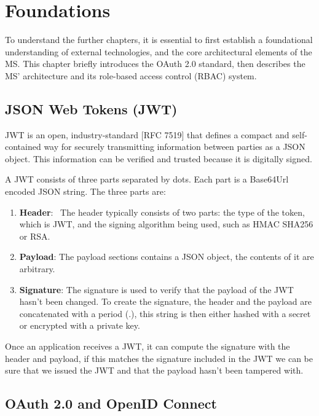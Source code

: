 \chapter{Foundations}
\label{cha:relatedwork}

To understand the further chapters,
it is essential to first establish a foundational understanding of 
external technologies, and the core architectural elements of the MS.
This chapter briefly introduces the OAuth 2.0 standard,
then describes the MS' architecture and its role-based access control (RBAC) system.

\section{JSON Web Tokens (JWT)}

JWT is an open, industry-standard [RFC 7519] that defines a compact and self-contained way for securely transmitting information between parties as a JSON object.
This information can be verified and trusted because it is digitally signed.

A JWT consists of three parts separated by dots.
Each part is a Base64Url encoded JSON string.
The three parts are:

\begin{enumerate}
  \item \textbf{Header}: \
    The header typically consists of two parts: the type of the token, which is JWT, and the signing algorithm being used, such as HMAC SHA256 or RSA.

  \item \textbf{Payload}:
    The payload sections contains a JSON object, the contents of it are arbitrary. 

\item \textbf{Signature}:
  The signature is used to verify that the payload of the JWT hasn't been changed.
  To create the signature, the header and the payload are concatenated with a period (.),
    this string is then either hashed with a secret or encrypted with a private key.
\end{enumerate}


Once an application receives a JWT, it can compute the signature with the header and payload,
if this matches the signature included in the JWT we can be sure that we issued the
JWT and that the payload hasn't been tampered with.

\section{OAuth 2.0 and OpenID Connect}
\label{cha:relatedwork:OAuth}

